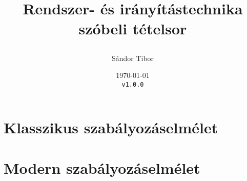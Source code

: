 \documentclass[a4paper,twoside,listof=totoc]{scrbook}
\title{
  Rendszer- és irányítástechnika \\
  szóbeli tételsor

}
\author{Sándor Tibor}
\date{
  \today \\
  \texttt{v1.0.0} \\
}
\numberwithin{equation}{section}
\begin{document}


\tableofcontents
\begingroup
\vfill
\let\cleardoublepage\relax
\listoffigures
\endgroup


\chapter{Klasszikus szabályozáselmélet}









\chapter{Modern szabályozáselmélet}

\setcounter{section}{7}









\end{document}
